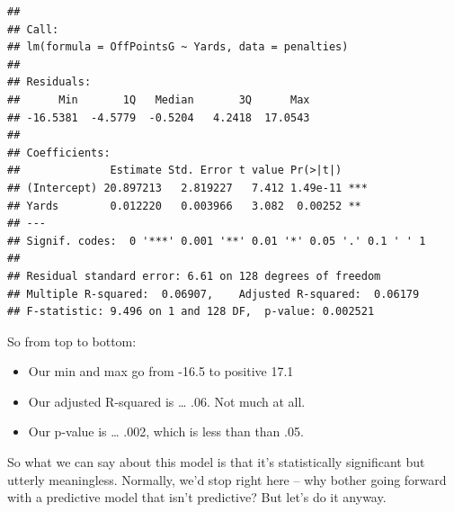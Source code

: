 \documentclass[]{book}
\newenvironment{Shaded}{\begin{snugshade}}{\end{snugshade}}
\newcommand{\KeywordTok}[1]{\textcolor[rgb]{0.13,0.29,0.53}{\textbf{#1}}}
\newcommand{\NormalTok}[1]{#1}
\newcommand{\OperatorTok}[1]{\textcolor[rgb]{0.81,0.36,0.00}{\textbf{#1}}}
\newcommand{\StringTok}[1]{\textcolor[rgb]{0.31,0.60,0.02}{#1}}
\providecommand{\tightlist}{%
  \setlength{\itemsep}{0pt}\setlength{\parskip}{0pt}}
\begin{document}
\begin{verbatim}
## 
## Call:
## lm(formula = OffPointsG ~ Yards, data = penalties)
## 
## Residuals:
##      Min       1Q   Median       3Q      Max 
## -16.5381  -4.5779  -0.5204   4.2418  17.0543 
## 
## Coefficients:
##              Estimate Std. Error t value Pr(>|t|)    
## (Intercept) 20.897213   2.819227   7.412 1.49e-11 ***
## Yards        0.012220   0.003966   3.082  0.00252 ** 
## ---
## Signif. codes:  0 '***' 0.001 '**' 0.01 '*' 0.05 '.' 0.1 ' ' 1
## 
## Residual standard error: 6.61 on 128 degrees of freedom
## Multiple R-squared:  0.06907,    Adjusted R-squared:  0.06179 
## F-statistic: 9.496 on 1 and 128 DF,  p-value: 0.002521
\end{verbatim}

So from top to bottom:

\begin{itemize}
\tightlist
\item
  Our min and max go from -16.5 to positive 17.1
\item
  Our adjusted R-squared is \ldots{} .06. Not much at all.
\item
  Our p-value is \ldots{} .002, which is less than than .05.
\end{itemize}

So what we can say about this model is that it's statistically significant but utterly meaningless. Normally, we'd stop right here -- why bother going forward with a predictive model that isn't predictive? But let's do it anyway.

\begin{Shaded}
\end{Shaded}

\begin{Shaded}
\end{Shaded}
\end{document}
